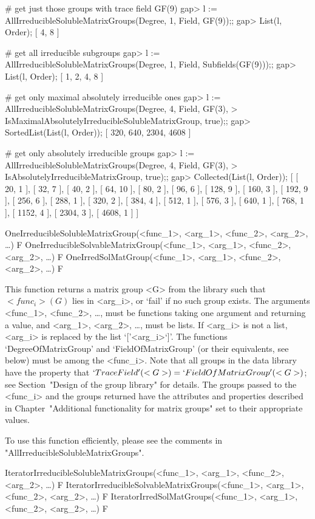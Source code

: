 \beginexample
# get just those groups with trace field GF(9)
gap> l := AllIrreducibleSolubleMatrixGroups(Degree, 1, Field, GF(9));;
gap> List(l, Order);
[ 4, 8 ]

# get all irreducible subgroups
gap> l := AllIrreducibleSolubleMatrixGroups(Degree, 1, Field, Subfields(GF(9)));;
gap> List(l, Order);
[ 1, 2, 4, 8 ]

# get only maximal absolutely irreducible ones
gap> l := AllIrreducibleSolubleMatrixGroups(Degree, 4, Field, GF(3),
>             IsMaximalAbsolutelyIrreducibleSolubleMatrixGroup, true);;
gap> SortedList(List(l, Order));
[ 320, 640, 2304, 4608 ]

# get only absolutely irreducible groups
gap> l := AllIrreducibleSolubleMatrixGroups(Degree, 4, Field, GF(3),
> IsAbsolutelyIrreducibleMatrixGroup, true);;
gap> Collected(List(l, Order));
[ [ 20, 1 ], [ 32, 7 ], [ 40, 2 ], [ 64, 10 ], [ 80, 2 ], [ 96, 6 ], 
  [ 128, 9 ], [ 160, 3 ], [ 192, 9 ], [ 256, 6 ], [ 288, 1 ], [ 320, 2 ], 
  [ 384, 4 ], [ 512, 1 ], [ 576, 3 ], [ 640, 1 ], [ 768, 1 ], [ 1152, 4 ], 
  [ 2304, 3 ], [ 4608, 1 ] ]
\endexample

\>OneIrreducibleSolubleMatrixGroup(<func_1>, <arg_1>, <func_2>, <arg_2>, \dots) F
\>OneIrreducibleSolvableMatrixGroup(<func_1>, <arg_1>, <func_2>, <arg_2>, \dots) F
\>OneIrredSolMatGroup(<func_1>, <arg_1>, <func_2>, <arg_2>, \dots) F

This function returns a matrix group <G> from the {\IRREDSOL} library such that
$<func_i>(G)$ lies in <arg_i>, or `fail' if no such group exists. The arguments <func_1>,
<func_2>, \dots, must be {\GAP} functions taking one argument and returning a value, and
<arg_1>, <arg_2>, \dots,  must be lists. If <arg_i> is not a list, <arg_i> is replaced by
the list `['<arg_i>`]'. The functions `DegreeOfMatrixGroup' and `FieldOfMatrixGroup' (or their equivalents, see below) must be among the <func_i>. 
 Note that all groups in the data library have the property that 
$`TraceField'(<G>) = `FieldOfMatrixGroup'(<G>)$; see Section~"Design of the group library" 
for details. 
The groups passed to the <func_i> and the groups returned have the attributes and properties described in 
Chapter~"Additional functionality for matrix groups" set to their appropriate values.

To use this function efficiently, please see the comments in 
"AllIrreducibleSolubleMatrixGroups".


\>IteratorIrreducibleSolubleMatrixGroups(<func_1>, <arg_1>, <func_2>, <arg_2>, \dots) F
\>IteratorIrreducibleSolvableMatrixGroups(<func_1>, <arg_1>, <func_2>, <arg_2>, \dots) F
\>IteratorIrredSolMatGroups(<func_1>, <arg_1>, <func_2>, <arg_2>, \dots) F

